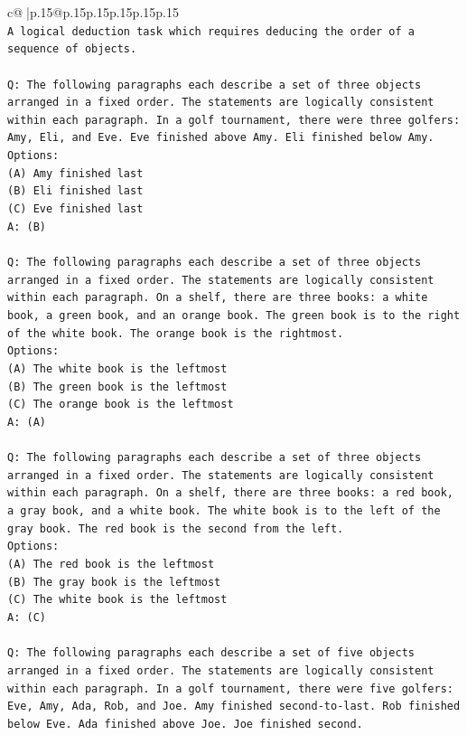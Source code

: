 \documentclass{article}
\begin{document}
{\begin{supertabular}{c@{$\;$}|p{.15\linewidth}@{}p{.15\linewidth}p{.15\linewidth}p{.15\linewidth}p{.15\linewidth}p{.15\linewidth}}
{{{\\ 
\texttt{A logical deduction task which requires deducing the order of a sequence of objects.} \\
\\ 
\texttt{Q: The following paragraphs each describe a set of three objects arranged in a fixed order. The statements are logically consistent within each paragraph. In a golf tournament, there were three golfers: Amy, Eli, and Eve. Eve finished above Amy. Eli finished below Amy.} \\
\texttt{Options:} \\
\texttt{(A) Amy finished last} \\
\texttt{(B) Eli finished last} \\
\texttt{(C) Eve finished last} \\
\texttt{A: (B)} \\
\\ 
\texttt{Q: The following paragraphs each describe a set of three objects arranged in a fixed order. The statements are logically consistent within each paragraph. On a shelf, there are three books: a white book, a green book, and an orange book. The green book is to the right of the white book. The orange book is the rightmost.} \\
\texttt{Options:} \\
\texttt{(A) The white book is the leftmost} \\
\texttt{(B) The green book is the leftmost} \\
\texttt{(C) The orange book is the leftmost} \\
\texttt{A: (A)} \\
\\ 
\texttt{Q: The following paragraphs each describe a set of three objects arranged in a fixed order. The statements are logically consistent within each paragraph. On a shelf, there are three books: a red book, a gray book, and a white book. The white book is to the left of the gray book. The red book is the second from the left.} \\
\texttt{Options:} \\
\texttt{(A) The red book is the leftmost} \\
\texttt{(B) The gray book is the leftmost} \\
\texttt{(C) The white book is the leftmost} \\
\texttt{A: (C)} \\
\\ 
\texttt{Q: The following paragraphs each describe a set of five objects arranged in a fixed order. The statements are logically consistent within each paragraph. In a golf tournament, there were five golfers: Eve, Amy, Ada, Rob, and Joe. Amy finished second{-}to{-}last. Rob finished below Eve. Ada finished above Joe. Joe finished second.} \\
}}}
\end{supertabular}}
\end{document}
